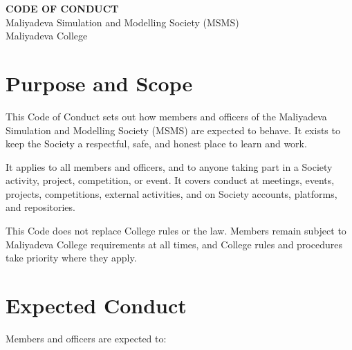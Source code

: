 \documentclass[a4paper]{article}
\begin{document}
\begin{center}
    {\Large\bfseries CODE OF CONDUCT}\\[0.5em]
    {\large Maliyadeva Simulation and Modelling Society (MSMS)}\\[0.3em]
    {\normalsize Maliyadeva College}
\end{center}

\vspace{1em}

\section{Purpose and Scope}

This Code of Conduct sets out how members and officers of the Maliyadeva
Simulation and Modelling Society (MSMS) are expected to behave. It exists
to keep the Society a respectful, safe, and honest place to learn and work.

It applies to all members and officers, and to anyone taking part in a
Society activity, project, competition, or event. It covers conduct at
meetings, events, projects, competitions, external activities, and on
Society accounts, platforms, and repositories.

This Code does not replace College rules or the law. Members remain
subject to Maliyadeva College requirements at all times, and College
rules and procedures take priority where they apply.

\section{Expected Conduct}

Members and officers are expected to:
\end{document}
